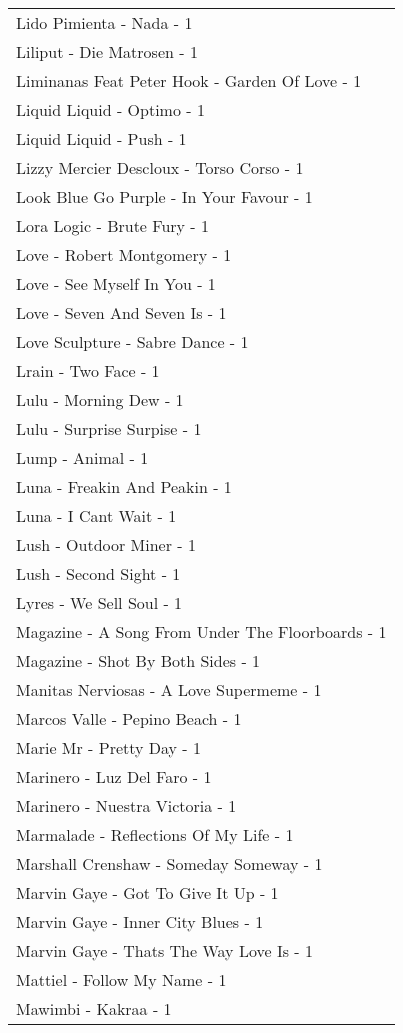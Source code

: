 \documentclass[
]{article}
\begin{document}
\begin{longtable}{l}
Lido Pimienta - Nada - 1 \\ 
Liliput - Die Matrosen - 1 \\ 
Liminanas Feat Peter Hook - Garden Of Love - 1 \\ 
Liquid Liquid - Optimo - 1 \\ 
Liquid Liquid - Push - 1 \\ 
Lizzy Mercier Descloux - Torso Corso - 1 \\ 
Look Blue Go Purple - In Your Favour - 1 \\ 
Lora Logic - Brute Fury - 1 \\ 
Love - Robert Montgomery - 1 \\ 
Love - See Myself In You - 1 \\ 
Love - Seven And Seven Is - 1 \\ 
Love Sculpture - Sabre Dance - 1 \\ 
Lrain - Two Face - 1 \\ 
Lulu - Morning Dew - 1 \\ 
Lulu - Surprise Surpise - 1 \\ 
Lump - Animal - 1 \\ 
Luna - Freakin And Peakin - 1 \\ 
Luna - I Cant Wait - 1 \\ 
Lush - Outdoor Miner - 1 \\ 
Lush - Second Sight - 1 \\ 
Lyres - We Sell Soul - 1 \\ 
Magazine - A Song From Under The Floorboards - 1 \\ 
Magazine - Shot By Both Sides - 1 \\ 
Manitas Nerviosas - A Love Supermeme - 1 \\ 
Marcos Valle - Pepino Beach - 1 \\ 
Marie Mr - Pretty Day - 1 \\ 
Marinero - Luz Del Faro - 1 \\ 
Marinero - Nuestra Victoria - 1 \\ 
Marmalade - Reflections Of My Life - 1 \\ 
Marshall Crenshaw - Someday Someway - 1 \\ 
Marvin Gaye - Got To Give It Up - 1 \\ 
Marvin Gaye - Inner City Blues - 1 \\ 
Marvin Gaye - Thats The Way Love Is - 1 \\ 
Mattiel - Follow My Name - 1 \\ 
Mawimbi - Kakraa - 1 \\ 

\end{longtable}
\end{document}
